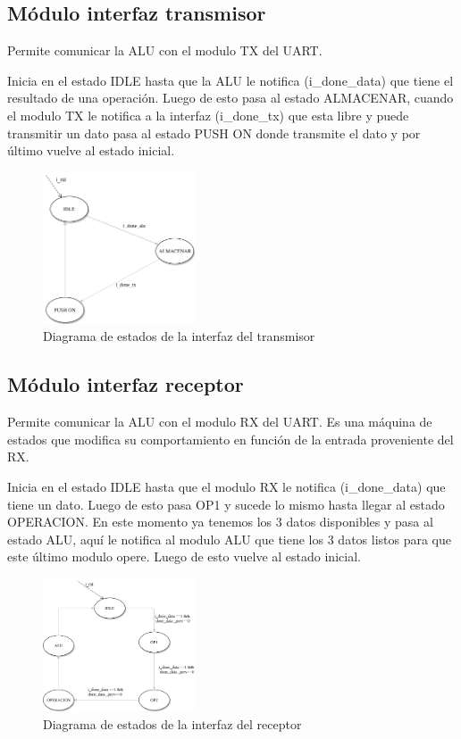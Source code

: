 \documentclass[a4paper]{article}
\begin{document}
\subsection{Módulo interfaz transmisor}
Permite comunicar la ALU con el modulo TX del UART.

Inicia en el estado IDLE hasta que la ALU le notifica (i\_done\_data) que tiene el resultado de una operación. Luego de esto pasa al estado ALMACENAR, cuando el modulo TX le notifica a la interfaz (i\_done\_tx) que esta libre y puede transmitir un dato pasa al estado PUSH ON donde transmite el dato y por último vuelve al estado inicial.
\begin{figure}[!htb]
\centering
\includegraphics[width=0.4\textwidth]{int_tx.png}
\caption{\label{fig:tests}Diagrama de estados de la interfaz del transmisor}
\end{figure}

\newpage

\subsection{Módulo interfaz receptor}
Permite comunicar la ALU con el modulo RX del UART. Es una máquina de estados que modifica su comportamiento en función de la entrada proveniente del RX.

Inicia en el estado IDLE hasta que el modulo RX le notifica (i\_done\_data) que tiene un dato. Luego de esto pasa OP1 y sucede lo mismo hasta llegar al estado OPERACION. En este momento ya tenemos los 3 datos disponibles y pasa al estado ALU, aquí le notifica al modulo ALU que tiene los 3 datos listos para que este último modulo opere. Luego de esto vuelve al estado inicial.
\begin{figure}[!htb]
\centering
\includegraphics[width=0.4\textwidth]{int_rx.png}
\caption{\label{fig:tests}Diagrama de estados de la interfaz del receptor}
\end{figure}
\end{document}

